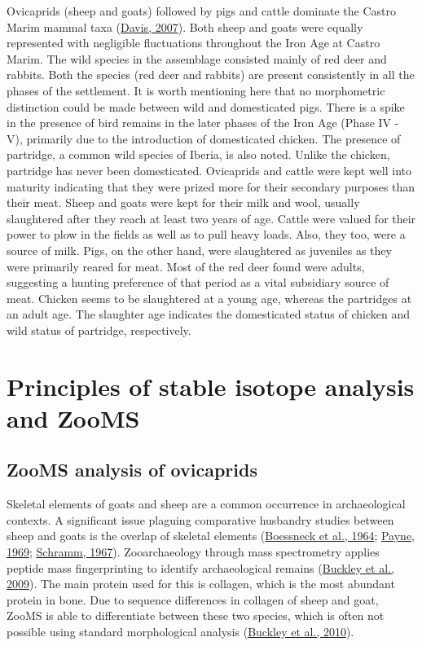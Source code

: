 \documentclass[preprint, 3p, authoryear]{elsarticle} %
\begin{document}
Ovicaprids (sheep and goats) followed by pigs and cattle dominate the Castro Marim mammal taxa (\protect\hyperlink{ref-davis07}{Davis, 2007}). Both sheep and goats were equally represented with negligible fluctuations throughout the Iron Age at Castro Marim. The wild species in the assemblage consisted mainly of red deer and rabbits. Both the species (red deer and rabbits) are present consistently in all the phases of the settlement. It is worth mentioning here that no morphometric distinction could be made between wild and domesticated pigs. There is a spike in the presence of bird remains in the later phases of the Iron Age (Phase IV - V), primarily due to the introduction of domesticated chicken. The presence of partridge, a common wild species of Iberia, is also noted. Unlike the chicken, partridge has never been domesticated. Ovicaprids and cattle were kept well into maturity indicating that they were prized more for their secondary purposes than their meat. Sheep and goats were kept for their milk and wool, usually slaughtered after they reach at least two years of age. Cattle were valued for their power to plow in the fields as well as to pull heavy loads. Also, they too, were a source of milk. Pigs, on the other hand, were slaughtered as juveniles as they were primarily reared for meat. Most of the red deer found were adults, suggesting a hunting preference of that period as a vital subsidiary source of meat. Chicken seems to be slaughtered at a young age, whereas the partridges at an adult age. The slaughter age indicates the domesticated status of chicken and wild status of partridge, respectively.

\hypertarget{principles-of-stable-isotope-analysis-and-zooms}{%
\section{Principles of stable isotope analysis and ZooMS}\label{principles-of-stable-isotope-analysis-and-zooms}}

\hypertarget{zooms-analysis-of-ovicaprids}{%
\subsection{ZooMS analysis of ovicaprids}\label{zooms-analysis-of-ovicaprids}}

Skeletal elements of goats and sheep are a common occurrence in archaeological contexts. A significant issue plaguing comparative husbandry studies between sheep and goats is the overlap of skeletal elements (\protect\hyperlink{ref-boessneck_etal64}{Boessneck et al., 1964}; \protect\hyperlink{ref-payne69}{Payne, 1969}; \protect\hyperlink{ref-schramm67}{Schramm, 1967}). Zooarchaeology through mass spectrometry applies peptide mass fingerprinting to identify archaeological remains (\protect\hyperlink{ref-buckley_etal09}{Buckley et al., 2009}). The main protein used for this is collagen, which is the most abundant protein in bone. Due to sequence differences in collagen of sheep and goat, ZooMS is able to differentiate between these two species, which is often not possible using standard morphological analysis (\protect\hyperlink{ref-buckley_etal10}{Buckley et al., 2010}).
\end{document}
